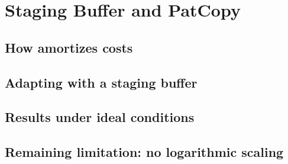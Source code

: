 \chapter{Staging Buffer and PatCopy}\label{ch:patcopy}

\section{How \pat{} amortizes costs}
\section{Adapting \bine{} with a staging buffer}
\section{Results under ideal conditions}
\section{Remaining limitation: no logarithmic scaling}

